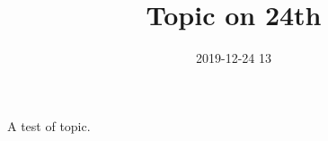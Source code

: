 \documentclass[a4paper]{article}
\title{ Topic on 24th }
\date{ 2019-12-24 13 }
\begin{document}
    \maketitle

    A test of topic.
\end{document}
